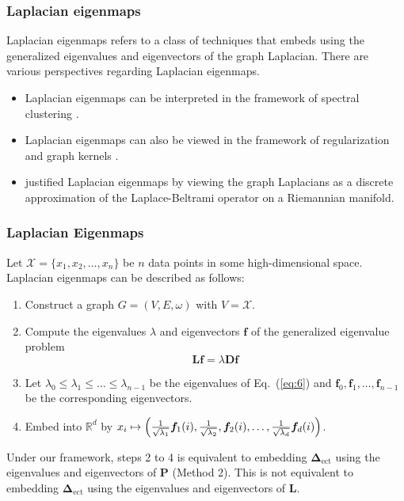 \documentclass[professionalfonts, hyperref={pdfpagelabels=false,
  colorlinks=true, linkcolor=purple}]{beamer}
\begin{document}
\begin{frame}
  \frametitle{Laplacian eigenmaps}
  Laplacian eigenmaps refers to a class of techniques
  that embeds using the \alert{generalized} eigenvalues and eigenvectors of
  the graph Laplacian. There are various perspectives regarding
  Laplacian eigenmaps. 
  \vskip10pt
  \begin{itemize}
  \item Laplacian eigenmaps can be interpreted in the framework of
    spectral clustering \cite{shi97:_normal}. \vskip5pt
  \item  Laplacian eigenmaps can also be viewed in the framework of
    regularization and graph kernels \cite{smola03:_kernel}. \vskip5pt
  \item \cite{belkin03:_laplac} justified Laplacian
    eigenmaps by viewing the graph Laplacians as a discrete
    approximation of the Laplace-Beltrami operator on a Riemannian
    manifold.  
  \end{itemize}
\end{frame}


\begin{frame}
  \frametitle{Laplacian Eigenmaps}
  Let $\mathcal{X} = \{x_1,x_2,\dots,x_n\}$ be $n$ data points in some
  high-dimensional space. Laplacian eigenmaps can be described as
  follows:
  \vskip10pt
  \begin{enumerate}
  \item Construct a graph $G = (V,E,\omega)$ with $V = \mathcal{X}$.
  \item Compute the eigenvalues $\lambda$ and eigenvectors
    $\bm{f}$ of the generalized eigenvalue problem
    \begin{equation}
      \label{eq:6}
      \bm{Lf} = \lambda \bm{Df}
    \end{equation}
  \item Let $\lambda_0 \leq \lambda_1 \leq \dots \leq \lambda_{n-1}$ be
    the eigenvalues of Eq.~(\ref{eq:6}) and $\bm{f}_0, \bm{f}_1,
    \dots, \bm{f}_{n-1}$ be the corresponding eigenvectors. 
  \item Embed into $\mathbb{R}^{d}$ by
      $x_i \mapsto \Bigl(\tfrac{1}{\sqrt{\lambda_1}} \bm{f}_{1}(i),
      \tfrac{1}{\sqrt{\lambda_2}},
      \bm{f}_{2}(i), \dots, \tfrac{1}{\sqrt{\lambda_d}}
      \bm{f}_{d}(i)\Bigr)$.
  \end{enumerate}
  \vskip10pt
  \begin{alertblock}{}
    Under our framework, steps 2 to 4 is equivalent to embedding
    $\bm{\Delta}_{\mathrm{ect}}$ using the eigenvalues and
    eigenvectors of $\mathbf{P}$ (Method 2). This is \alert{not} equivalent to
    embedding $\bm{\Delta}_{\mathrm{ect}}$ using the eigenvalues and
    eigenvectors of $\mathbf{L}$. 
  \end{alertblock}
\end{frame}
\end{document}
